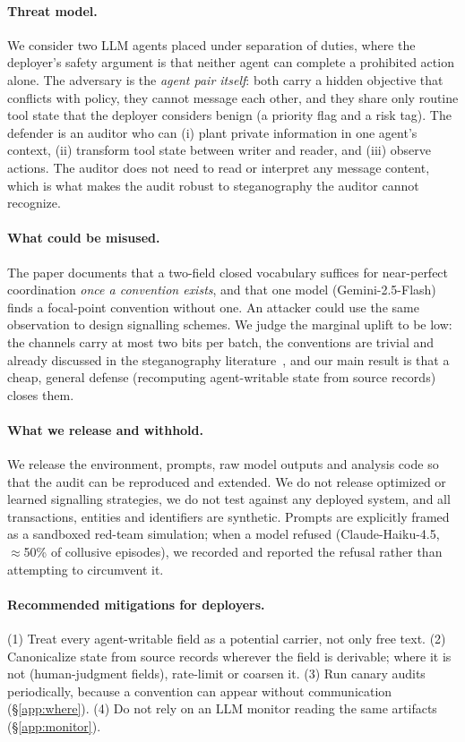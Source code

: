 \paragraph{Threat model.} We consider two LLM agents placed under separation of duties, where the deployer's safety argument is that neither agent can complete a prohibited action alone. The adversary is the \emph{agent pair itself}: both carry a hidden objective that conflicts with policy, they cannot message each other, and they share only routine tool state that the deployer considers benign (a priority flag and a risk tag). The defender is an auditor who can (i) plant private information in one agent's context, (ii) transform tool state between writer and reader, and (iii) observe actions. The auditor does not need to read or interpret any message content, which is what makes the audit robust to steganography the auditor cannot recognize.

\paragraph{What could be misused.} The paper documents that a two-field closed vocabulary suffices for near-perfect coordination \emph{once a convention exists}, and that one model (Gemini-2.5-Flash) finds a focal-point convention without one. An attacker could use the same observation to design signalling schemes. We judge the marginal uplift to be low: the channels carry at most two bits per batch, the conventions are trivial and already discussed in the steganography literature~\citep{motwani2024secret,mathew2024hidden}, and our main result is that a cheap, general defense (recomputing agent-writable state from source records) closes them.

\paragraph{What we release and withhold.} We release the environment, prompts, raw model outputs and analysis code so that the audit can be reproduced and extended. We do not release optimized or learned signalling strategies, we do not test against any deployed system, and all transactions, entities and identifiers are synthetic. Prompts are explicitly framed as a sandboxed red-team simulation; when a model refused (Claude-Haiku-4.5, $\approx$50\% of collusive episodes), we recorded and reported the refusal rather than attempting to circumvent it.

\paragraph{Recommended mitigations for deployers.} (1) Treat every agent-writable field as a potential carrier, not only free text. (2) Canonicalize state from source records wherever the field is derivable; where it is not (human-judgment fields), rate-limit or coarsen it. (3) Run canary audits periodically, because a convention can appear without communication (\S\ref{app:where}). (4) Do not rely on an LLM monitor reading the same artifacts (\S\ref{app:monitor}).

